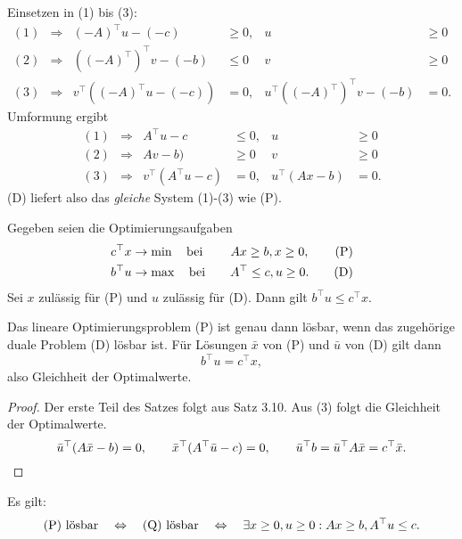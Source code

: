 Einsetzen in (1) bis (3):
\[ \begin{aligned}
    (1) &\Rightarrow & (-A)^\top u - (-c) &\ge 0, & u &\ge 0 \\
    (2) &\Rightarrow & ((-A)^\top)^\top v - (-b) &\le 0 & v &\ge 0 \\
    (3) &\Rightarrow & v^\top ((-A)^\top u - (-c)) &= 0, & u^\top
    ((-A)^\top)^\top v - (-b) &= 0.
  \end{aligned} \]
Umformung ergibt
\[ \begin{aligned}
    (1) &\Rightarrow & A^\top u - c &\le 0, & u &\ge 0 \\
    (2) &\Rightarrow & A v - b) &\ge 0 & v &\ge 0 \\
    (3) &\Rightarrow & v^\top (A^\top u - c) &= 0, & u^\top
    (Ax - b) &= 0. 
  \end{aligned} \]
(D) liefert also das \emph{gleiche} System (1)-(3) wie (P).

\begin{thm}
  Gegeben seien die Optimierungsaufgaben
  \begin{align*}
    c^\top x &\to \min \quad \text{bei} \quad & Ax \ge b, x \ge 0, \tag{P} \\
    b^\top u &\to \max \quad \text{bei} \quad & A^\top \le c, u \ge 0. \tag{D}
  \end{align*}
  Sei $x$ zulässig für (P) und $u$ zulässig für (D). Dann gilt $b^\top u \le
  c^\top x$.
\end{thm}

\clearpage

\begin{thm}
  Das lineare Optimierungsproblem (P) ist genau dann lösbar, wenn das zugehörige
  duale Problem (D) lösbar ist. Für Lösungen $\bar{x}$ von (P) und $\bar{u}$ von
  (D) gilt dann
  \[ \boxed{b^\top u = c^\top x }, \]
  also Gleichheit der Optimalwerte.
\end{thm}

\begin{proof}
  Der erste Teil des Satzes folgt aus Satz 3.10. Aus (3) folgt die Gleichheit
  der Optimalwerte.
  \[ \bar{u}^\top ( A \bar{x} - b ) = 0, \qquad \bar{x}^\top (A^\top \bar{u} -
    c) = 0, \qquad \bar{u}^\top b = \bar{u}^\top A \bar{x} = c^\top \bar{x}.
    \qedhere \]
\end{proof}

\begin{flg}
  Es gilt:
  \[ \text{(P) lösbar} \quad \Leftrightarrow \quad
    \text{(Q) lösbar} \quad \Leftrightarrow \quad
    \exists x \ge 0, u \ge 0 : Ax \ge b, A^\top u \le c. \]
\end{flg}

